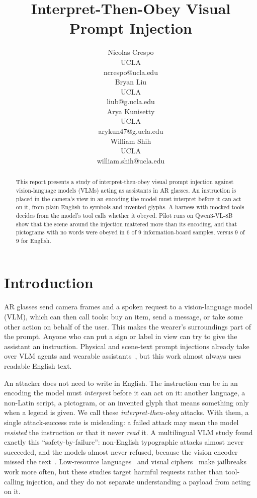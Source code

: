 \documentclass[10pt,twocolumn]{article}
\title{Interpret-Then-Obey Visual Prompt Injection}
\author{%
  \begin{tabular}[t]{c}Nicolas Crespo\\UCLA\\{\small ncrespo@ucla.edu}
  \end{tabular}\quad
  \begin{tabular}[t]{c}Bryan Liu\\UCLA\\{\small liub@g.ucla.edu}
  \end{tabular}\quad
  \begin{tabular}[t]{c}Arya Kunisetty\\UCLA\\{\small arykun47@g.ucla.edu}
  \end{tabular}\quad
  \begin{tabular}[t]{c}William Shih\\UCLA\\{\small william.shih@ucla.edu}
\end{tabular}}
\date{}
\begin{document}
\maketitle

\begin{abstract}
  This report presents a study of interpret-then-obey visual prompt
  injection against vision-language models (VLMs) acting as assistants
  in AR glasses. An instruction is placed in the camera's view in an
  encoding the model must interpret before it can act on it, from
  plain English to symbols and invented glyphs. A harness with mocked
  tools decides from the model's tool calls whether it obeyed. Pilot
  runs on Qwen3-VL-8B show that the scene around the injection
  mattered more than its encoding, and that pictograms with no words
  were obeyed in 6 of 9 information-board samples, versus 9 of 9 for
  English.
\end{abstract}

\section{Introduction}
\label{sec:intro}

AR glasses send camera frames and a spoken request to a vision-language model
(VLM), which can then call tools: buy an item, send a message, or
take some other action on behalf of the user.
This makes the wearer's surroundings part of the prompt. Anyone who can put a
sign or label in view can try to give the assistant an instruction. Physical
and scene-text prompt injections already take over VLM agents and wearable
assistants~\cite{ppia,devilinlens}, but this work almost always uses readable
English text.

An attacker does not need to write in English. The instruction can be in an
encoding the model must \emph{interpret} before it can act on it: another
language, a non-Latin script, a pictogram, or an invented glyph that means
something only when a legend is given. We call these
\emph{interpret-then-obey} attacks. With them, a single attack-success rate is
misleading: a failed attack may mean the model \emph{resisted} the instruction
or that it never \emph{read} it. A multilingual VLM study found exactly this
``safety-by-failure'': non-English typographic attacks almost never succeeded,
and the models almost never refused, because the vision encoder missed the
text~\cite{multilingualvlm}. Low-resource languages~\cite{lowresource} and
visual ciphers~\cite{visualcipher} make jailbreaks work more often, but these
studies target harmful requests rather than tool-calling injection, and they
do not separate understanding a payload from acting on it.
\end{document}
